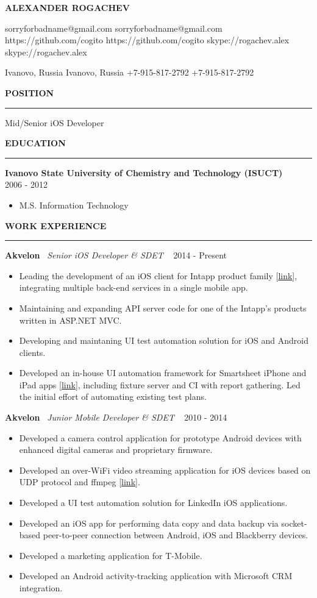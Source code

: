 ﻿\documentclass{article}
\newcommand*{\applicant}[1]{\gdef\applicanttext{#1}}
\newcommand*{\github}[1]{\gdef\githubtext{#1}}
\newcommand*{\email}[1]{\gdef\emailtext{#1}}
\newcommand*{\skype}[1]{\gdef\skypetext{#1}}
\newcommand*{\location}[1]{\gdef\locationtext{#1}}
\newcommand*{\phone}[1]{\gdef\phonetext{#1}}
\renewcommand\maketitle{
  {\setstretch{1.2}
    \centerline{
       \textbf{\huge{\expandafter\MakeUppercase\expandafter{\applicanttext}}}
    }
    \begin{center}
      \ifdefined\emailtext
        \faEnvelopeO \hspace{0.1cm} \emailtext \hspace{0.1cm}
      \fi
      \ifdefined\githubtext
        \faGithub \hspace{0.1cm} \githubtext \hspace{0.1cm}
      \fi
      \ifdefined\skypetext
        \faSkype \hspace{0.1cm} \skypetext \hspace{0.1cm}

      \fi
      \ifdefined\linkedintext
        \faLinkedin \hspace{0.1cm} \linkedintext

      \fi
    \end{center}

    \begin{center}
      \ifdefined\locationtext
        \faHome \hspace{0.1cm} \locationtext \hspace{0.1cm}
      \fi
      \ifdefined\phonetext
        \faMobile \hspace{0.1cm} \phonetext \hspace{0.1cm}

      \fi
    \end{center}
  }
}
\newcommand{\cvsection}[1]{
  \vspace{2.6ex}
  \noindent\textbf{\large{\uppercase{#1}}}
  \vspace{1ex}
  \hrule
  \vspace{1.5ex}
}
\newcommand{\cvparagraph}[3]{
  \noindent\indent
  \textbf{#1}
  \ 
  \textit{#2}
  \ 
  \hfill{}
  {#3}\vspace{1ex}}
\newcommand{\cvlist}[1]{
  \begin{itemize}[topsep=0ex,leftmargin=*,itemsep=0ex,parsep=1ex,labelwidth=\parindent]
    #1
  \end{itemize}
}
\begin{document}
\pagestyle{fancy}
\fancyhf{}
\renewcommand{\headrulewidth}{0pt}
\cfoot{ \the\year }

\applicant{Alexander Rogachev}
\github{https://github.com/cogito}
\email{sorryforbadname@gmail.com}
\skype{skype://rogachev.alex}
\location{Ivanovo, Russia}
\phone{+7-915-817-2792}

\maketitle

\cvsection{Position}
Mid/Senior iOS Developer

\cvsection{Education}
\cvparagraph{Ivanovo State University of Chemistry and Technology (ISUCT)}{}{2006 - 2012}
\begin{itemize}[topsep=0ex,leftmargin=*]
  \item M.S. Information Technology
\end{itemize}

\cvsection{Work Experience}

\cvparagraph{Akvelon}{Senior iOS Developer \& SDET}{2014 - Present}
\cvlist{
  \item Leading the development of an iOS client for Intapp product family [\href{https://itunes.apple.com/us/app/intapp/id1052877767}{link}], integrating multiple back-end services in a single mobile app.
  \item Maintaining and expanding API server code for one of the Intapp's products written in ASP.NET MVC.
  \item Developing and maintaning UI test automation solution for iOS and Android clients.
  \item Developed an in-house UI automation framework for Smartsheet iPhone and iPad apps [\href{https://itunes.apple.com/us/app/smartsheet/id568421135}{link}], including fixture server and CI with report gathering. Led the initial effort of automating existing test plans.
}
\vspace{1ex}

\cvparagraph{Akvelon}{Junior Mobile Developer \& SDET}{2010 - 2014}
\cvlist{
  \item Developed a camera control application for prototype Android devices with enhanced digital cameras and proprietary firmware.
  \item Developed an over-WiFi video streaming application for iOS devices based on UDP protocol and ffmpeg [\href{http://neuronbeta.com/chirpglobal/chirpvision/app/}{link}].
  \item Developed a UI test automation solution for LinkedIn iOS applications.
  \item Developed an iOS app for performing data copy and data backup via socket-based peer-to-peer connection between Android, iOS and Blackberry devices.
  \item Developed a marketing application for T-Mobile.
  \item Developed an Android activity-tracking application with Microsoft CRM integration.
}
\end{document}
